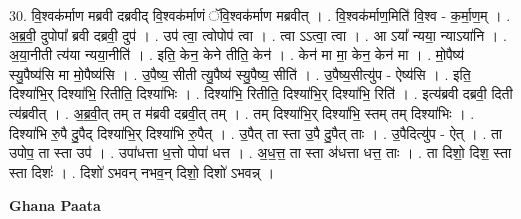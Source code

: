 \documentclass[17pt]{extarticle}
\begin{document}
30. वि॒श्वक॑र्माण मब्रवी दब्रवीद् वि॒श्वक॑र्माणं ॅवि॒श्वक॑र्माण मब्रवीत् । . वि॒श्वक॑र्माण॒मिति॑ वि॒श्व - क॒र्मा॒ण॒म् । . अ॒ब्र॒वी॒ दुपोपा᳚ ब्रवी दब्रवी॒ दुप॑ । . उप॑ त्वा॒ त्वोपोप॑ त्वा । . त्वा ऽऽत्वा॒ त्वा । . आ ऽया᳚ न्यया॒ न्याऽया॑नि । . अ॒या॒नीती त्य॑या न्यया॒नीति॑ । . इति॒ केन॒ केने तीति॒ केन॑ । . केन॑ मा मा॒ केन॒ केन॑ मा । . मो॒पैष्य॑ स्यु॒पैष्य॑सि मा मो॒पैष्य॑सि । . उ॒पैष्य॒ सीती त्यु॒पैष्य॑ स्यु॒पैष्य॒ सीति॑ । . उ॒पैष्य॒सीत्यु॑प - ऐष्य॑सि । . इति॒ दिश्या॑भि॒र् दिश्या॑भि॒ रितीति॒ दिश्या॑भिः । . दिश्या॑भि॒ रितीति॒ दिश्या॑भि॒र् दिश्या॑भि॒ रिति॑ । . इत्य॑ब्रवी दब्रवी॒ दिती त्य॑ब्रवीत् । . अ॒ब्र॒वी॒त् तम् त म॑ब्रवी दब्रवी॒त् तम् । . तम् दिश्या॑भि॒र् दिश्या॑भि॒ स्तम् तम् दिश्या॑भिः । . दिश्या॑भि रु॒पै दु॒पैद् दिश्या॑भि॒र् दिश्या॑भि रु॒पैत् । . उ॒पैत् ता स्ता उ॒पै दु॒पैत् ताः । . उ॒पैदित्यु॑प - ऐत् । . ता उपोप॒ ता स्ता उप॑ । . उपा॑धत्ता ध॒त्तो पोपा॑ धत्त । . अ॒ध॒त्त॒ ता स्ता अ॑धत्ता धत्त॒ ताः । . ता दिशो॒ दिश॒ स्ता स्ता दिशः॑ । . दिशो॑ ऽभवन् नभव॒न् दिशो॒ दिशो॑ ऽभवन्न् । \newline

\textbf{Ghana Paata } \newline
\end{document}
